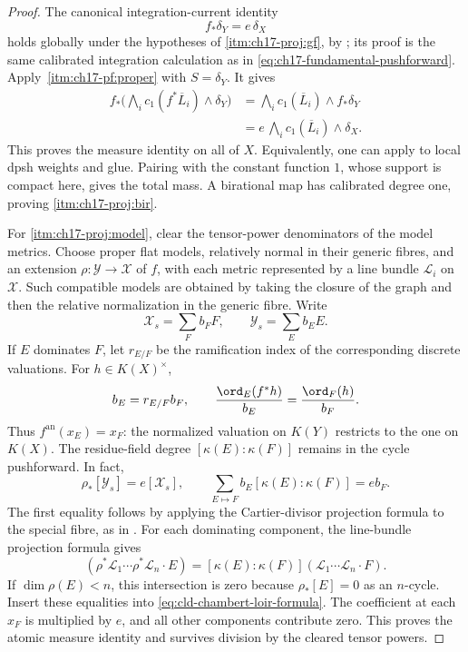 \begin{proof}
The canonical integration-current identity
\[
                            f_*\delta_Y=e\,\delta_X
\]
holds globally under the hypotheses of \cref{itm:ch17-proj:gf}, by
\cite[Proposition~16.1.2]{CLD25}; its proof is the same calibrated
integration calculation as in
\eqref{eq:ch17-fundamental-pushforward}.  Apply
\,\cref{itm:ch17-pf:proper} with
$S=\delta_Y$.  It gives
\[
\begin{aligned}
 f_*\bigl(\bigwedge_i c_1(f^*\overline L_i)\wedge\delta_Y\bigr)
   &=\bigwedge_i c_1(\overline L_i)\wedge f_*\delta_Y\\
   &=e\,\bigwedge_i c_1(\overline L_i)\wedge\delta_X .
\end{aligned}
\]
This proves the measure identity on all of $X$.  Equivalently, one
can apply \cite[Proposition~16.1.5]{CLD25} to local dpsh weights
and glue.  Pairing with the constant function $1$, whose support is
compact here, gives the total mass.  A birational map has calibrated
degree one, proving \cref{itm:ch17-proj:bir}.

For \cref{itm:ch17-proj:model}, clear the tensor-power denominators
of the model metrics.  Choose proper flat models, relatively normal
in their generic fibres, and an extension $\rho:\mathcal Y\to\mathcal X$
of $f$, with each metric
represented by a line bundle $\mathcal L_i$ on $\mathcal X$.
Such compatible models are obtained by taking the closure of the
graph and then the relative normalization in the generic fibre.  Write
\[
               \mathcal X_s=\sum_F b_FF,\qquad
               \mathcal Y_s=\sum_E b_EE .
\]
If $E$ dominates $F$, let $r_{E/F}$ be the ramification index of the
corresponding discrete valuations.  For $h\in K(X)^\times$,
\[
 b_E=r_{E/F}b_F,\qquad
 \frac{\ord_E(f^*h)}{b_E}=\frac{\ord_F(h)}{b_F}.
\]
Thus $f^{\mathrm{an}}(x_E)=x_F$: the normalized valuation on $K(Y)$
restricts to the one on $K(X)$.  The residue-field degree
$[\kappa(E):\kappa(F)]$ remains in the cycle pushforward.
In fact,
\[
 \rho_*[\mathcal Y_s]=e[\mathcal X_s],
 \qquad
 \sum_{E\mapsto F}b_E[\kappa(E):\kappa(F)]=e b_F .
\]
The first equality follows by applying the Cartier-divisor projection
formula to the special fibre, as in
.  For each dominating component,
the line-bundle projection formula gives
\[
 (\rho^*\mathcal L_1\cdots\rho^*\mathcal L_n\cdot E)
   =[\kappa(E):\kappa(F)](\mathcal L_1\cdots\mathcal L_n\cdot F).
\]
If $\dim\rho(E)<n$, this intersection is zero because
$\rho_*[E]=0$ as an $n$-cycle.  Insert these equalities into
\eqref{eq:cld-chambert-loir-formula}.  The coefficient at each $x_F$
is multiplied by $e$, and all other components contribute zero.
This proves the atomic measure identity and survives division by
the cleared tensor powers.
\end{proof}


